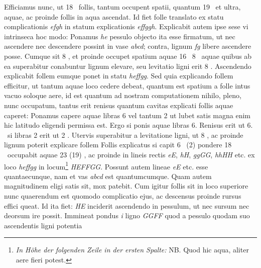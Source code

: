       \pstart Efficiamus nunc, ut 18 \Pfund\ follis, tantum occupent spatii, quantum 19 \Pfund\ et ultra, aquae, ac proinde follis in aqua ascendat. Id fiet folle translato ex statu complicationis \textit{efgh} in statum explicationis \textit{effggh}. Explicabit autem ipse sese vi intrinseca\protect{} hoc modo: Ponamus \textit{he}  pessulo objecto ita esse firmatum, ut nec ascendere nec descendere possint in vase \textit{abcd}; contra, lignum \textit{fg} libere ascendere posse. Cumque sit 8 \Pfund, et proinde occupet spatium aquae 16 \Pfund\ 8 \Pfund\ aquae quibus ab ea superabitur conabuntur lignum elevare, seu levitatio ligni erit 8 \Pfund. Ascendendo explicabit follem eumque ponet in statu \textit{heffgg}. Sed quia explicando follem efficitur, ut tantum aquae loco cedere debeat, quantum est spatium a folle  intus vacuo soloque aere, id est quantum ad nostram computationem nihilo, pleno, nunc occupatum, tantus erit renisus quantum cavitas explicati follis aquae caperet: Ponamus capere aquae libras 6 vel tantum 2 ut lubet satis magna enim hic latitudo eligendi permissa est. Ergo si ponis aquae libras 6. Renisus erit ut 6. \Pfund\ si libras 2 erit ut 2 \Pfund. Utervis superabitur a levitatione ligni, ut 8 \Pfund, ac proinde lignum poterit explicare follem  Follis explicatus si capit  6 \Pfund\ (2) pondere 18 \Pfund\ occupabit aquae 23 (19) \Pfund, ac proinde  in lineis rectis \textit{eE}, \textit{hH}, \textit{ggGG}, \textit{hhHH} etc. ex loco \textit{heffgg} in locum\footnote{\textit{In H\"{o}he der folgenden Zeile in der ersten Spalte:} NB. Quod hic aqua, aliter aere fieri potest.} \textit{HEFFGG}. Possunt autem lineae \textit{eE} etc. esse quantaecunque, nam et vas \textit{abcd} est quantumcumque. Quam autem magnitudinem eligi satis sit, mox patebit. Cum igitur follis  sit in loco superiore nunc quaerendum est quomodo complicatio ejus, ac descensus proinde rursus effici queat. Id ita fiet:  \textit{HE} inciderit ascendendo in pessulum, ut nec sursum nec deorsum ire possit. Immineat pondus \textit{i} ligno \textit{GGFF} quod a pessulo quodam suo ascendentis ligni potentia 